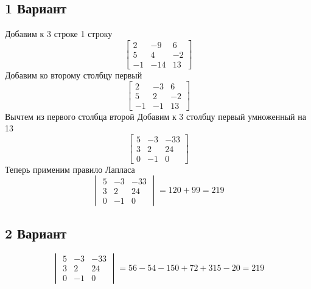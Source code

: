 \documentclass[titlepage]{article}
\begin{document}
\subsection*{1 Вариант}

Добавим к 3 строке 1 строку
\begin{equation}
\begin{bmatrix}
	2 & -9 & 6 \\
	5 & 4 & -2 \\
	-1 & -14 & 13
\end{bmatrix}
\end{equation}
Добавим ко второму столбцу первый
\begin{equation}
\begin{bmatrix}
	2 & -3 & 6 \\
	5 & 2 & -2 \\
	-1 & -1 & 13
\end{bmatrix}
\end{equation}
Вычтем из первого столбца второй
Добавим к 3 столбцу первый умноженный на 13
\begin{equation}
\begin{bmatrix}
	5 & -3 & -33 \\
	3 & 2 & 24 \\
	0 & -1 & 0
\end{bmatrix}
\end{equation}
Теперь применим правило Лапласа
\begin{equation}
\begin{vmatrix}
	5 & -3 & -33 \\
	3 & 2 & 24 \\
	0 & -1 & 0
\end{vmatrix} = 120 + 99 = 219
\end{equation}
\subsection*{2 Вариант}
\begin{equation}
\begin{vmatrix}
	5 & -3 & -33 \\
	3 & 2 & 24 \\
	0 & -1 & 0
\end{vmatrix} = 56 - 54 - 150 + 72 + 315 - 20 = 219
\end{equation}
\end{document}
